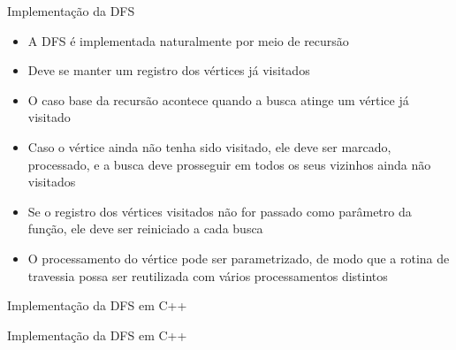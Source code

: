\begin{frame}[fragile]{Implementação da DFS}

    \begin{itemize}
        \item A DFS é implementada naturalmente por meio de recursão

        \item Deve se manter um registro dos vértices já visitados

        \item O caso base da recursão acontece quando a busca atinge um vértice já visitado

        \item Caso o vértice ainda não tenha sido visitado, ele deve ser marcado, processado, e
            a busca deve prosseguir em todos os seus vizinhos ainda não visitados
      
        \item Se o registro dos vértices visitados não for passado como parâmetro da função,
            ele deve ser reiniciado a cada busca

        \item O processamento do vértice pode ser parametrizado, de modo que a rotina de
            travessia possa ser reutilizada com vários processamentos distintos
    \end{itemize}

\end{frame}
\begin{frame}[fragile]{Implementação da DFS em C++}
\end{frame}

\begin{frame}[fragile]{Implementação da DFS em C++}
\end{frame}
